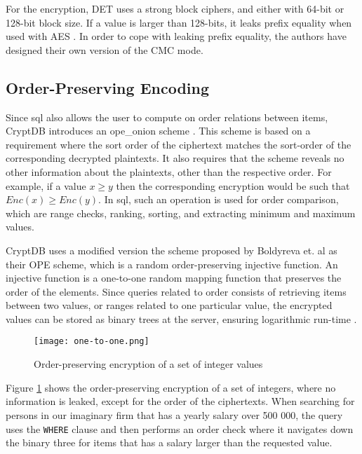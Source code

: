 \noindent
For the encryption, DET uses a strong block ciphers, and either with 64-bit or 128-bit block size. If a value is larger than 128-bits, it leaks  prefix equality when used with AES \citep{CryptDB_Main_Paper}. In order to cope with leaking prefix equality, the authors have designed their own version of the CMC mode.



\subsection{Order-Preserving Encoding}
\label{sec:ope}

Since \Gls{sql} also allows the user to compute on order relations between items, CryptDB introduces an \Gls{ope_onion} scheme \citep{CryptDB_Main_Paper}. This scheme is based on a requirement where the sort order of the ciphertext matches the sort-order of the corresponding decrypted plaintexts. It also requires that the scheme reveals no other information about the plaintexts, other than the respective order. For example, if a value $x \ge y$ then the corresponding encryption would be such that $Enc(x) \ge Enc(y)$. In \Gls{sql}, such an operation is used for order comparison, which are range checks, ranking, sorting, and extracting minimum and maximum values. 

CryptDB uses a modified version the scheme proposed by Boldyreva et. al \citep{ope_cryptdb} as their OPE scheme, which is a random order-preserving injective function. An injective function is a one-to-one random mapping function that preserves the order of the elements. Since queries related to order consists of retrieving items between two values, or ranges related to one particular value, the encrypted values can be stored as binary trees at the server, ensuring logarithmic run-time \cite{ope_cryptdb}.



\begin{figure}[h]
	\texttt{[image: one-to-one.png]}
	\caption{Order-preserving encryption of a set of integer values}
	\label{fig:ope_function}
\end{figure}

Figure \ref{fig:ope_function} shows the order-preserving encryption of a set of integers, where no information is leaked, except for the order of the ciphertexts. When searching for persons in our imaginary firm that has a yearly salary over 500 000, the query uses the \verb!WHERE! clause and then performs an order check where it navigates down the binary three for items that has a salary larger than the requested value.

